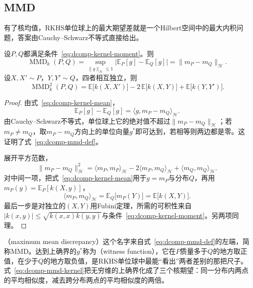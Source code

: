 \subsection{MMD}
\label{sec:dcomp-mmd}

有了核均值，RKHS单位球上的最大期望差就是一个Hilbert空间中的最大内积问题，答案由Cauchy--Schwarz不等式直接给出。

\begin{theorem}[MMD的表示]
\label{thm:dcomp-mmd}
设$P,Q$都满足条件~\eqref{eq:dcomp-kernel-moment}。则
\begin{equation}
 \operatorname{MMD}_k(P,Q)=\sup_{\lVert g\rVert_{\mathcal{H}}\leq1}\bigl\lvert\mathbb{E}_{P}[g]-\mathbb{E}_{Q}[g]\bigr\rvert=\lVert m_P-m_Q\rVert_{\mathcal{H}} .
 \label{eq:dcomp-mmd-def}
\end{equation}
设$X,X'\sim P$，$Y,Y'\sim Q$，四者相互独立，则
\begin{equation}
 \operatorname{MMD}_k^{2}(P,Q)=\mathbb{E}\bigl[k(X,X')\bigr]-2\,\mathbb{E}\bigl[k(X,Y)\bigr]+\mathbb{E}\bigl[k(Y,Y')\bigr] .
 \label{eq:dcomp-mmd-kernel}
\end{equation}
\end{theorem}

\begin{proof}
由式~\eqref{eq:dcomp-kernel-mean}，
\[
 \mathbb{E}_{P}[g]-\mathbb{E}_{Q}[g]=\langle g,m_P-m_Q\rangle_{\mathcal{H}} .
\]
由Cauchy--Schwarz不等式，单位球上它的绝对值不超过$\lVert m_P-m_Q\rVert_{\mathcal{H}}$；若$m_P\neq m_Q$，取$m_P-m_Q$方向上的单位向量$g^{*}$即可达到，若相等则两边都是零。这证明了式~\eqref{eq:dcomp-mmd-def}。

展开平方范数，
\[
 \lVert m_P-m_Q\rVert_{\mathcal{H}}^{2}=\langle m_P,m_P\rangle_{\mathcal{H}}-2\langle m_P,m_Q\rangle_{\mathcal{H}}+\langle m_Q,m_Q\rangle_{\mathcal{H}} .
\]
对中间一项，把式~\eqref{eq:dcomp-kernel-mean}用于$g=m_P$与分布$Q$，再用$m_P(y)=\mathbb{E}_{P}[k(X,y)]$，
\[
 \langle m_P,m_Q\rangle_{\mathcal{H}}=\mathbb{E}_{Q}\bigl[m_P(Y)\bigr]=\mathbb{E}\bigl[k(X,Y)\bigr] .
\]
最后一步是对独立的$(X,Y)$用Fubini定理，所需的可积性来自$\lvert k(x,y)\rvert\leq\sqrt{k(x,x)k(y,y)}$与条件~\eqref{eq:dcomp-kernel-moment}。另两项同理。
\end{proof}

（maximum mean discrepancy）这个名字来自式~\eqref{eq:dcomp-mmd-def}的左端，简称MMD。达到上确界的$g^{*}$称为（witness function），它在$P$质量多于$Q$的地方取正值，在少于$Q$的地方取负值，是RKHS单位球中最能“看出”两者差别的那把尺子。式~\eqref{eq:dcomp-mmd-kernel}把无穷维的上确界化成了三个核期望：同一分布内两点的平均相似度，减去跨分布两点的平均相似度的两倍。

